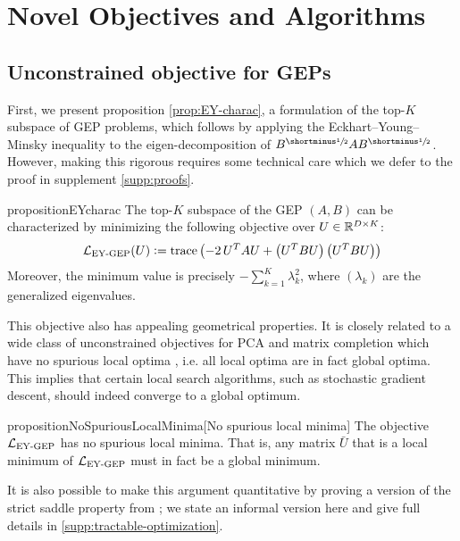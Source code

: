 \section{Novel Objectives and Algorithms}\label{sec:contributions}
\subsection{Unconstrained objective for GEPs}\label{sec:gep-ey-formulation}
First, we present proposition \ref{prop:EY-charac}, a formulation of the top-$K$ subspace of GEP problems, which follows by applying the Eckhart--Young--Minsky inequality \citep{stewart_matrix_1990} to the eigen-decomposition of $B^\mhalf A B^\mhalf$. However, making this rigorous requires some technical care which we defer to the proof in supplement \ref{supp:proofs}.

\begin{restatable}{proposition}{EYcharac}
\label{prop:EY-charac}
    The top-$K$ subspace of the GEP $(A,B)$ can be characterized by minimizing the following objective over $U \in \mathbb{R}^{D \times K}$:
    \begin{align}\label{eq:EY-charac}
        \mathcal{L}_\text{EY-GEP}(U) \vcentcolon= \operatorname{trace} \left( - 2\,U^T A U + \left(U^T B U\right) \left(U^T B U\right) \right)
    \end{align}
    Moreover, the minimum value is precisely $- \sum_{k=1}^K \lambda_k^2$, where $(\lambda_k)$ are the generalized eigenvalues.
\end{restatable}

This objective also has appealing geometrical properties.
It is closely related to a wide class of unconstrained objectives for PCA and matrix completion which have no spurious local optima \citep{ge_no_2017}, i.e. all local optima are in fact global optima.
This implies that certain local search algorithms, such as stochastic gradient descent, should indeed converge to a global optimum.

\begin{restatable}{proposition}{NoSpuriousLocalMinima}[No spurious local minima]\label{prop:no-spurious}
    The objective $\mathcal{L}_\text{EY-GEP}$ has no spurious local minima.
    That is, any matrix $\bar{U}$ that is a local minimum of $\mathcal{L}_\text{EY-GEP}$ must in fact be a global minimum.
\end{restatable}

It is also possible to make this argument quantitative by proving a version of the strict saddle property from \cite{ge_no_2017,ge2015escaping}; we state an informal version here and give full details in \cref{supp:tractable-optimization}.

